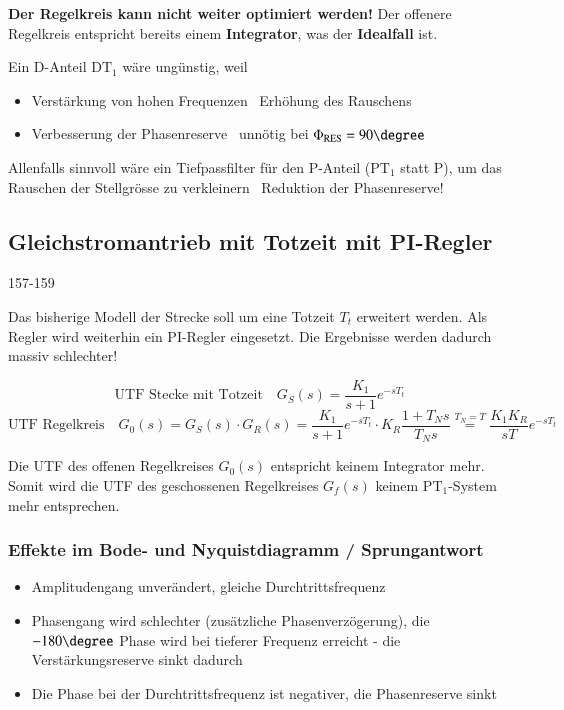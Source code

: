 \textbf{Der Regelkreis kann nicht weiter optimiert werden!} Der offenere Regelkreis entspricht bereits einem \textbf{Integrator},
was der \textbf{Idealfall} ist. 

Ein D-Anteil $\text{DT}_1$ wäre ungünstig, weil

\begin{itemize}
    \item Verstärkung von hohen Frequenzen \textrightarrow\ Erhöhung des Rauschens
    \item Verbesserung der Phasenreserve \textrightarrow\ unnötig bei $\Phi_{\rm RES} = 90 \degree$
\end{itemize}

Allenfalls sinnvoll wäre ein Tiefpassfilter für den P-Anteil ($\text{PT}_1$ statt P), um das Rauschen der Stellgrösse zu 
verkleinern \textrightarrow\ Reduktion der Phasenreserve!


\subsection{Gleichstromantrieb mit Totzeit mit PI-Regler}{157-159}

Das bisherige Modell der Strecke soll um eine Totzeit $T_t$ erweitert werden. Als Regler wird weiterhin ein PI-Regler eingesetzt.
Die Ergebnisse werden dadurch massiv schlechter!

$$ \text{UTF Stecke mit Totzeit} \quad G_S(s) = \frac{K_1}{s + 1} e^{-s T_t} $$
$$ \text{UTF Regelkreis} \quad G_0(s) = G_S(s) \cdot G_R(s) = \frac{K_1}{s + 1} e^{-s T_t} \cdot K_R \frac{1 + T_N s}{T_N s}
    \overset{T_N = T}{=} \frac{K_1 K_R}{s T} e^{-s T_t} $$

Die UTF des offenen Regelkreises $G_0(s)$ entspricht keinem Integrator mehr. Somit wird die UTF des geschossenen Regelkreises 
$G_f(s)$ keinem $\text{PT}_1$-System mehr entsprechen. 


\subsubsection{Effekte im Bode- und Nyquistdiagramm / Sprungantwort}

\begin{itemize}
    \item Amplitudengang unverändert, gleiche Durchtrittsfrequenz
    \item Phasengang wird schlechter (zusätzliche Phasenverzögerung), die $-180 \degree$ Phase wird bei tieferer
        Frequenz erreicht - die Verstärkungsreserve sinkt dadurch
    \item Die Phase bei der Durchtrittsfrequenz ist negativer, die Phasenreserve sinkt
\end{itemize}

